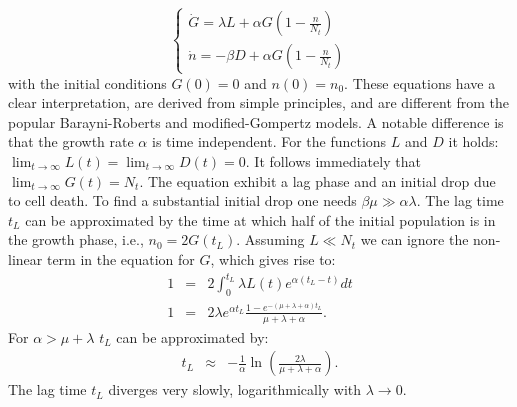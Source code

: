 \documentclass[10pt,A4paper]{article}
\begin{document}
\begin{equation}
    \begin{cases}
        \dot{G} = \lambda L + \alpha G\left(1-\frac{n}{N_t}\right)\\
        \dot{n} = - \beta D + \alpha G\left(1-\frac{n}{N_t}\right)
    \end{cases}
\end{equation}
with the initial conditions $G(0)=0$ and $n(0)=n_0$. 
These equations have a clear interpretation, are derived from simple principles, and are different from the popular Barayni-Roberts and modified-Gompertz models. 
A notable difference is that the growth rate $\alpha$ is time independent. 
For the functions $L$ and $D$ it holds: $\lim_{t\to\infty} L(t) = \lim_{t\to\infty} D(t) = 0$. 
It follows immediately that $\lim_{t\to\infty} G(t) = N_t$. 
The equation exhibit a lag phase and an initial drop due to cell death. 
To find a substantial initial drop one needs $\beta \mu \gg \alpha \lambda$. 
The lag time $t_L$ can be approximated by the time at which half of the initial population is in the growth phase, i.e., $n_0=2G(t_L)$. 
Assuming $L\ll N_t$ we can ignore the non-linear term in the equation for $G$, which gives rise to:
\begin{eqnarray}
    1&=& 2\int_0^{t_L} \lambda L(t)e^{\alpha(t_L-t)}dt\\
    1  &=& 2\lambda e^{\alpha t_L}\frac{1-e^{-(\mu+\lambda+\alpha)t_L}}{\mu+\lambda+\alpha}.
\end{eqnarray}
For $\alpha > \mu+\lambda$ $t_L$ can be approximated by:
\begin{eqnarray}
    t_L &\approx& -\frac{1}{\alpha}\ln\left(\frac{2\lambda}{\mu+\lambda+\alpha}\right).
\end{eqnarray}
The lag time $t_L$ diverges very slowly, logarithmically with $\lambda\to 0$.
%
%
%
\end{document}
